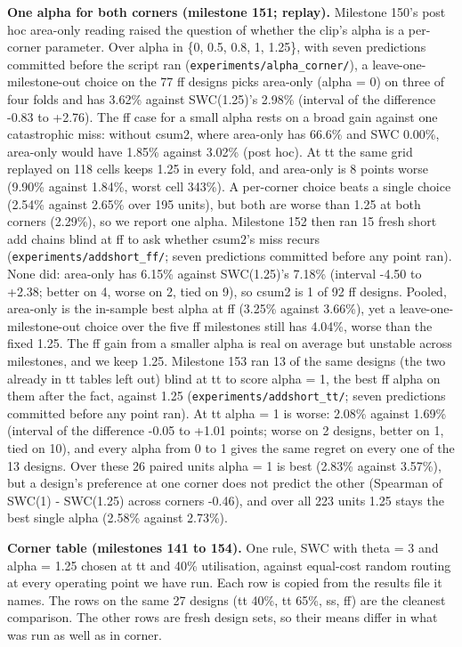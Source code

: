 \documentclass[conference]{IEEEtran}
\begin{document}
\textbf{One alpha for both corners (milestone 151; replay).} Milestone
150's post hoc area-only reading raised the question of whether the
clip's alpha is a per-corner parameter. Over alpha in \{0, 0.5, 0.8, 1,
1.25\}, with seven predictions committed before the script ran
(\texttt{experiments/\allowbreak{}alpha\_\allowbreak{}corner/\allowbreak{}}), a leave-one-milestone-out choice
on the 77 ff designs picks area-only (alpha = 0) on three of four folds
and has 3.62\% against SWC(1.25)'s 2.98\% (interval of the difference
-0.83 to +2.76). The ff case for a small alpha rests on a broad gain
against one catastrophic miss: without csum2, where area-only has 66.6\%
and SWC 0.00\%, area-only would have 1.85\% against 3.02\% (post hoc).
At tt the same grid replayed on 118 cells keeps 1.25 in every fold, and
area-only is 8 points worse (9.90\% against 1.84\%, worst cell 343\%). A
per-corner choice beats a single choice (2.54\% against 2.65\% over 195
units), but both are worse than 1.25 at both corners (2.29\%), so we
report one alpha. Milestone 152 then ran 15 fresh short add chains blind
at ff to ask whether csum2's miss recurs
(\texttt{experiments/\allowbreak{}addshort\_\allowbreak{}ff/\allowbreak{}}; seven predictions committed before
any point ran). None did: area-only has 6.15\% against SWC(1.25)'s
7.18\% (interval -4.50 to +2.38; better on 4, worse on 2, tied on 9), so
csum2 is 1 of 92 ff designs. Pooled, area-only is the in-sample best
alpha at ff (3.25\% against 3.66\%), yet a leave-one-milestone-out
choice over the five ff milestones still has 4.04\%, worse than the
fixed 1.25. The ff gain from a smaller alpha is real on average but
unstable across milestones, and we keep 1.25. Milestone 153 ran 13 of
the same designs (the two already in tt tables left out) blind at tt to
score alpha = 1, the best ff alpha on them after the fact, against 1.25
(\texttt{experiments/\allowbreak{}addshort\_\allowbreak{}tt/\allowbreak{}}; seven predictions committed before
any point ran). At tt alpha = 1 is worse: 2.08\% against 1.69\%
(interval of the difference -0.05 to +1.01 points; worse on 2 designs,
better on 1, tied on 10), and every alpha from 0 to 1 gives the same
regret on every one of the 13 designs. Over these 26 paired units alpha
= 1 is best (2.83\% against 3.57\%), but a design's preference at one
corner does not predict the other (Spearman of SWC(1) - SWC(1.25) across
corners -0.46), and over all 223 units 1.25 stays the best single alpha
(2.58\% against 2.73\%).

\textbf{Corner table (milestones 141 to 154).} One rule, SWC with theta
= 3 and alpha = 1.25 chosen at tt and 40\% utilisation, against
equal-cost random routing at every operating point we have run. Each row
is copied from the results file it names. The rows on the same 27
designs (tt 40\%, tt 65\%, ss, ff) are the cleanest comparison. The
other rows are fresh design sets, so their means differ in what was run
as well as in corner.
\end{document}
